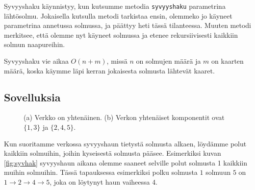 Syvyyshaku käynnistyy, kun kutsumme metodia
\texttt{syvyyshaku} parametrina lähtösolmu.
Jokaisella kutsulla metodi tarkistaa ensin,
olemmeko jo käyneet parametrina annetussa solmussa,
ja päättyy heti tässä tilanteessa.
Muuten metodi merkitsee, että olemme nyt käyneet solmussa
ja etenee rekursiivisesti kaikkiin solmun naapureihin.

Syvyyshaku vie aikaa $O(n+m)$, missä $n$ on solmujen määrä
ja $m$ on kaarten määrä,
koska käymme läpi kerran jokaisesta solmusta lähtevät kaaret.

\subsection{Sovelluksia}

\begin{figure}
\center
\begin{center}
\end{center}
\caption{(a) Verkko on yhtenäinen. (b) Verkon yhtenäiset komponentit ovat $\{1,3\}$ ja $\{2,4,5\}$.}
\label{fig:veryht}
\end{figure}

Kun suoritamme verkossa syvyyshaun tietystä solmusta alkaen,
löydämme polut kaikkiin solmuihin, joihin kyseisestä
solmusta pääsee.
Esimerkiksi kuvan \ref{fig:syvhak} syvyyshaun aikana
olemme saaneet selville polut solmusta 1 kaikkiin muihin solmuihin.
Tässä tapauksessa esimerkiksi polku solmusta $1$ solmuun $5$ on
$1 \rightarrow 2 \rightarrow 4 \rightarrow 5$,
joka on löytynyt haun vaiheessa 4.

